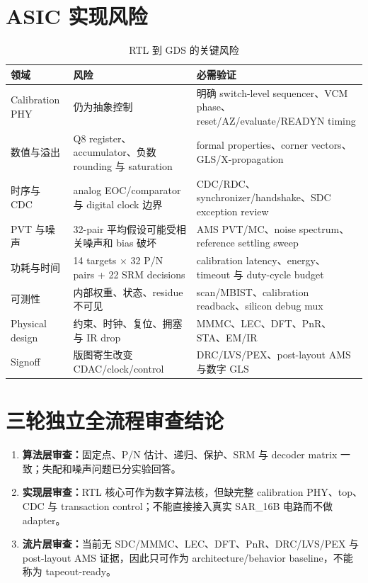 \documentclass[UTF8,fontset=none,a4paper,11pt,openany]{ctexrep}
\begin{document}
\section{ASIC 实现风险}

\begin{table}[H]
\centering
\small
\caption{RTL 到 GDS 的关键风险}
\label{tab:asic-risks}
\begin{tabularx}{\textwidth}{L{0.20\textwidth}L{0.27\textwidth}Y}
\toprule
领域 & 风险 & 必需验证\\
\midrule
Calibration PHY &  仍为抽象控制 & 明确 switch-level sequencer、VCM phase、reset/AZ/evaluate/READYN timing\\
数值与溢出 & Q8 register、accumulator、负数 rounding 与 saturation & formal properties、corner vectors、GLS/X-propagation\\
时序与 CDC & analog EOC/comparator 与 digital clock 边界 & CDC/RDC、synchronizer/handshake、SDC exception review\\
PVT 与噪声 & 32-pair 平均假设可能受相关噪声和 bias 破坏 & AMS PVT/MC、noise spectrum、reference settling sweep\\
功耗与时间 & 14 targets $\times$ 32 P/N pairs + 22 SRM decisions & calibration latency、energy、timeout 与 duty-cycle budget\\
可测性 & 内部权重、状态、residue 不可见 & scan/MBIST、calibration readback、silicon debug mux\\
Physical design & 约束、时钟、复位、拥塞与 IR drop & MMMC、LEC、DFT、PnR、STA、EM/IR\\
Signoff & 版图寄生改变 CDAC/clock/control & DRC/LVS/PEX、post-layout AMS 与数字 GLS\\
\bottomrule
\end{tabularx}
\end{table}

\section{三轮独立全流程审查结论}

\begin{enumerate}
  \item \textbf{算法层审查：}固定点、P/N 估计、递归、保护、SRM 与 decoder matrix 一致；失配和噪声问题已分实验回答。
  \item \textbf{实现层审查：}RTL 核心可作为数字算法核，但缺完整 calibration PHY、top、CDC 与 transaction control；不能直接接入真实 SAR\_16B 电路而不做 adapter。
  \item \textbf{流片层审查：}当前无 SDC/MMMC、LEC、DFT、PnR、DRC/LVS/PEX 与 post-layout AMS 证据，因此只可作为 architecture/behavior baseline，不能称为 tapeout-ready。
\end{enumerate}
\end{document}
